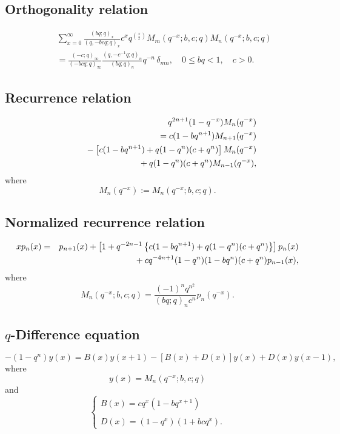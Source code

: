 \documentclass[envcountchap,graybox]{svmono}
\newcommand{\mathindent}{\hspace{7.5mm}}
\begin{document}
\newpage

\subsection*{Orthogonality relation}
\begin{eqnarray}
\label{OrtqMeixner}
& &\sum_{x=0}^{\infty}\frac{(bq;q)_x}{(q,-bcq;q)_x}c^xq^{\binom{x}{2}}M_m(q^{-x};b,c;q)M_n(q^{-x};b,c;q)\nonumber\\
& &{}=\frac{(-c;q)_{\infty}}{(-bcq;q)_{\infty}}\frac{(q,-c^{-1}q;q)_n}{(bq;q)_n}q^{-n}\,\delta_{mn},
\quad 0\leq bq<1,\quad c>0.
\end{eqnarray}

\subsection*{Recurrence relation}
\begin{eqnarray}
\label{RecqMeixner}
& &q^{2n+1}(1-q^{-x})M_n(q^{-x})\nonumber\\
& &{}=c(1-bq^{n+1})M_{n+1}(q^{-x})\nonumber\\
& &{}\mathindent{}-\left[c(1-bq^{n+1})+q(1-q^n)(c+q^n)\right]M_n(q^{-x})\nonumber\\
& &{}\mathindent\mathindent{}+q(1-q^n)(c+q^n)M_{n-1}(q^{-x}),
\end{eqnarray}
where
$$M_n(q^{-x}):=M_n(q^{-x};b,c;q).$$

\subsection*{Normalized recurrence relation}
\begin{eqnarray}
\label{NormRecqMeixner}
xp_n(x)&=&p_{n+1}(x)+
\left[1+q^{-2n-1}\left\{c(1-bq^{n+1})+q(1-q^n)(c+q^n)\right\}\right]p_n(x)\nonumber\\
& &{}\mathindent{}+cq^{-4n+1}(1-q^n)(1-bq^n)(c+q^n)p_{n-1}(x),
\end{eqnarray}
where
$$M_n(q^{-x};b,c;q)=\frac{(-1)^nq^{n^2}}{(bq;q)_nc^n}p_n(q^{-x}).$$

\subsection*{$q$-Difference equation}
\begin{equation}
\label{dvqMeixner}
-(1-q^n)y(x)=B(x)y(x+1)-\left[B(x)+D(x)\right]y(x)+D(x)y(x-1),
\end{equation}
where
$$y(x)=M_n(q^{-x};b,c;q)$$
and
$$\left\{\begin{array}{l}\displaystyle B(x)=cq^x(1-bq^{x+1})\\
\\
\displaystyle D(x)=(1-q^x)(1+bcq^x).\end{array}\right.$$
\end{document}

